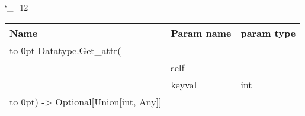 \begingroup \catcode`\_=12 \tt
\begin{tabular}{lll}
\toprule
\textrm{Name}&\textrm{Param name}&\textrm{param type}\\
\midrule
\hbox to 0pt {Datatype.Get_attr(\hss}\\
& self\\
& keyval & int\\
\hbox to 0pt{) -> Optional[Union[int, Any]]\hss}\\
\bottomrule
\end{tabular}
\endgroup
